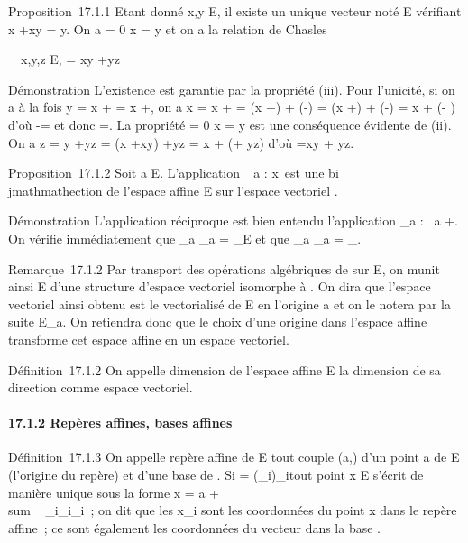 \documentclass[]{article}
\begin{document}
Proposition~17.1.1 Etant donné x,y \in E, il existe un unique vecteur noté
\overrightarrowxy \in\overrightarrow
E vérifiant x +\overrightarrow xy = y. On a
\overrightarrowxy = 0 \Leftrightarrow x
= y et on a la relation de Chasles

\forall~~x,y,z \in E,
\overrightarrowxz =\overrightarrow
xy +\overrightarrow yz

Démonstration L'existence est garantie par la propriété (iii). Pour
l'unicité, si on a à la fois y = x +\overrightarrow \xi
= x +\overrightarrow \eta, on a x = x
+ = (x
+\overrightarrow \xi) +
(-\overrightarrow\xi) = (x
+\overrightarrow \eta) +
(-\overrightarrow\xi) = x +
(\overrightarrow\eta -\overrightarrow
\xi) d'où \overrightarrow\xi
-\overrightarrow \eta = et donc \overrightarrow\xi
=\overrightarrow \eta. La propriété
\overrightarrowxy = 0 \Leftrightarrow x
= y est une conséquence évidente de (ii). On a z = y
+\overrightarrow yz = (x
+\overrightarrow xy)
+\overrightarrow yz = x +
(\overrightarrowxy +\overrightarrow
yz) d'où \overrightarrowxz
=\overrightarrow xy +\overrightarrow
yz.

Proposition~17.1.2 Soit a \in E. L'application \phi_a :
x\mapsto~\overrightarrowax est
une bi\\jmathmathection de l'espace affine E sur l'espace vectoriel
\overrightarrowE.

Démonstration L'application réciproque est bien entendu l'application
\psi_a :\overrightarrow
\xi\mapsto~a +\overrightarrow \xi.
On vérifie immédiatement que \psi_a \cdot \phi_a =
\mathrmId_E et que \phi_a \cdot \psi_a
=
\mathrmId_\overrightarrowE.

Remarque~17.1.2 Par transport des opérations algébriques de
\overrightarrowE sur E, on munit ainsi E d'une
structure d'espace vectoriel isomorphe à
\overrightarrowE. On dira que l'espace vectoriel
ainsi obtenu est le vectorialisé de E en l'origine a et on le notera par
la suite E_a. On retiendra donc que le choix d'une origine dans
l'espace affine transforme cet espace affine en un espace vectoriel.

Définition~17.1.2 On appelle dimension de l'espace affine E la dimension
de sa direction \overrightarrowE comme espace
vectoriel.

\paragraph{17.1.2 Repères affines, bases affines}

Définition~17.1.3 On appelle repère affine de E tout couple (a,) d'un
point a de E (l'origine du repère) et d'une base  de
\overrightarrowE. Si  =
(\vece_i)_i\inI tout point x \in E
s'écrit de manière unique sous la forme x = a
+ \\sum ~
_i\inIx_i\vece_i~; on dit que
les x_i sont les coordonnées du point x dans le repère affine~;
ce sont également les coordonnées du vecteur
\overrightarrowax dans la base .
\end{document}
